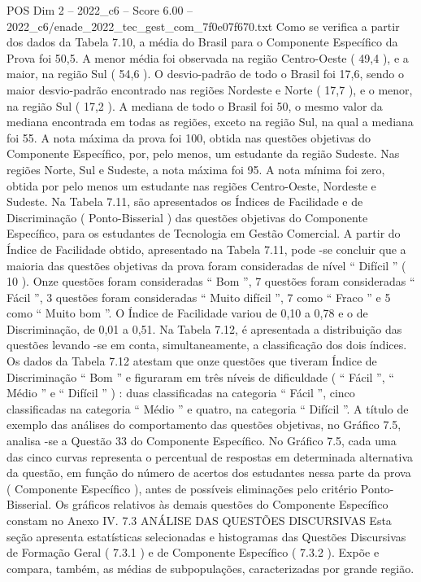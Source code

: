 \begin{textsample}{POS Dim 2 – 2022\_c6 – Score 6.00 – 2022\_c6/enade\_2022\_tec\_gest\_com\_7f0e07f670.txt}
Como se verifica a partir dos dados da Tabela 7.10, a média do Brasil para o Componente Específico da Prova foi 50,5.
A menor média foi observada na região Centro-Oeste ( 49,4 ), e a maior, na região Sul ( 54,6 ).
O desvio-padrão de todo o Brasil foi 17,6, sendo o maior desvio-padrão encontrado nas regiões Nordeste e Norte ( 17,7 ), e o menor, na região Sul ( 17,2 ).
A mediana de todo o Brasil foi 50, o mesmo valor da mediana encontrada em todas as regiões, exceto na região Sul, na qual a mediana foi 55.
A nota máxima da prova foi 100, obtida nas questões objetivas do Componente Específico, por, pelo menos, um estudante da região Sudeste.
Nas regiões Norte, Sul e Sudeste, a nota máxima foi 95.
A nota mínima foi zero, obtida por pelo menos um estudante nas regiões Centro-Oeste, Nordeste e Sudeste.
Na Tabela 7.11, são apresentados os Índices de Facilidade e de Discriminação ( Ponto-Bisserial ) das questões objetivas do Componente Específico, para os estudantes de Tecnologia em Gestão Comercial.
A partir do Índice de Facilidade obtido, apresentado na Tabela 7.11, pode -se concluir que a maioria das questões objetivas da prova foram consideradas de nível “ Difícil ” ( 10 ).
Onze questões foram consideradas “ Bom ”, 7 questões foram consideradas “ Fácil ”, 3 questões foram consideradas “ Muito difícil ”, 7 como “ Fraco ” e 5 como “ Muito bom ”.
O Índice de Facilidade variou de 0,10 a 0,78 e o de Discriminação, de 0,01 a 0,51.
Na Tabela 7.12, é apresentada a distribuição das questões levando -se em conta, simultaneamente, a classificação dos dois índices.
Os dados da Tabela 7.12 atestam que onze questões que tiveram Índice de Discriminação “ Bom ” e figuraram em três níveis de dificuldade ( “ Fácil ”, “ Médio ” e “ Difícil ” ) : duas classificadas na categoria “ Fácil ”, cinco classificadas na categoria “ Médio ” e quatro, na categoria “ Difícil ”.
A título de exemplo das análises do comportamento das questões objetivas, no Gráfico 7.5, analisa -se a Questão 33 do Componente Específico.
No Gráfico 7.5, cada uma das cinco curvas representa o percentual de respostas em determinada alternativa da questão, em função do número de acertos dos estudantes nessa parte da prova ( Componente Específico ), antes de possíveis eliminações pelo critério Ponto-Bisserial.
Os gráficos relativos às demais questões do Componente Específico constam no Anexo IV. 7.3 ANÁLISE DAS QUESTÕES DISCURSIVAS Esta seção apresenta estatísticas selecionadas e histogramas das Questões Discursivas de Formação Geral ( 7.3.1 ) e de Componente Específico ( 7.3.2 ).
Expõe e compara, também, as médias de subpopulações, caracterizadas por grande região.

\end{textsample}
